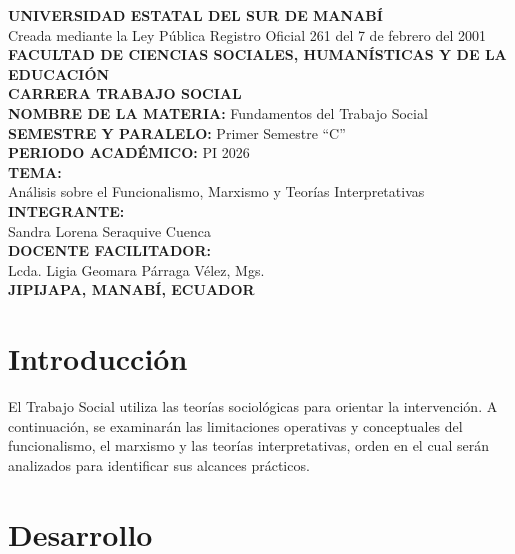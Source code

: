 \documentclass[12pt,spanish]{article}
\begin{document}
\begin{center}
    \vspace*{1.5cm}
    \normalsize\textbf{UNIVERSIDAD ESTATAL DEL SUR DE MANABÍ} \\[0.2cm]
    \normalsize Creada mediante la Ley Pública Registro Oficial 261 del 7 de febrero del 2001 \\[0.4cm]
    \normalsize\textbf{FACULTAD DE CIENCIAS SOCIALES, HUMANÍSTICAS Y DE LA EDUCACIÓN} \\[0.3cm]
    \textbf{CARRERA TRABAJO SOCIAL} \\[1.2cm]
    
    \textbf{NOMBRE DE LA MATERIA:} Fundamentos del Trabajo
Social \\[0.3cm]
    \textbf{SEMESTRE Y PARALELO:} Primer Semestre ``C'' \\[0.3cm]
    \textbf{PERIODO ACADÉMICO:} PI 2026 \\[1.2cm]
    
    \textbf{TEMA:} \\[0.2cm]
    Análisis sobre el Funcionalismo, Marxismo y Teorías
Interpretativas \\[1.2cm]
    
    \textbf{INTEGRANTE:} \\[0.2cm]
    Sandra Lorena Seraquive Cuenca \\[1.2cm]
    
    \textbf{DOCENTE FACILITADOR:} \\[0.2cm]
    Lcda. Ligia Geomara Párraga Vélez, Mgs. \\[1.8cm]
    
    \textbf{JIPIJAPA, MANABÍ, ECUADOR}
\end{center}

\thispagestyle{empty}
\newpage
{}
\doublespacing
\setlength{\parindent}{1.27cm}

\section{Introducción}\label{introducciuxf3n}

El Trabajo Social utiliza las teorías sociológicas para orientar la
intervención. A continuación, se examinarán las limitaciones operativas
y conceptuales del funcionalismo, el marxismo y las teorías
interpretativas, orden en el cual serán analizados para identificar sus
alcances prácticos.

\section{Desarrollo}\label{desarrollo}
\end{document}
